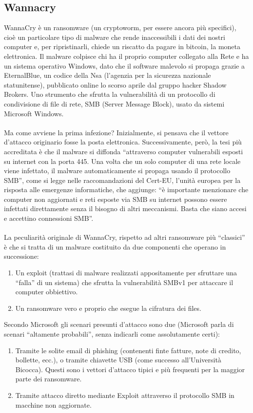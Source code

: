 \documentclass[8pt]{extarticle}
\begin{document}
\subsection{Wannacry}
WannaCry è un ransomware (un cryptoworm, per essere ancora più specifici), cioè un particolare tipo di malware che 
rende inaccessibili i dati dei nostri computer e, per ripristinarli, chiede un riscatto da pagare in bitcoin, 
la moneta elettronica. Il malware colpisce chi ha il proprio computer collegato alla Rete e ha un sistema operativo 
Windows, dato che il software malevolo si propaga grazie a EternalBlue, un codice della Nsa (l’agenzia per la 
sicurezza nazionale statunitense), pubblicato online lo scorso aprile dal gruppo hacker Shadow Brokers. 
Uno strumento che sfrutta la vulnerabilità di un protocollo di condivisione di file di rete, SMB (Server Message Block), 
usato da sistemi Microsoft Windows.\\\\
Ma come avviene la prima infezione? Inizialmente, si pensava che il vettore d’attacco originario fosse la posta 
elettronica. Successivamente, però, la tesi più accreditata è che il malware si diffonda “attraverso computer 
vulnerabili esposti su internet con la porta 445. Una volta che un solo computer di una rete locale viene infettato, 
il malware automaticamente si propaga usando il protocollo SMB”, come si legge nelle raccomandazioni del Cert-EU, 
l’unità europea per la risposta alle emergenze informatiche, che aggiunge: “è importante menzionare che computer 
non aggiornati e reti esposte via SMB su internet possono essere infettati direttamente senza il bisogno di altri 
meccanismi. Basta che siano accesi e accettino connessioni SMB”.\\\\
La peculiarità originale di WannaCry, rispetto ad altri ransomware più “classici” è che si tratta di un malware 
costituito da due componenti che operano in successione:
\begin{enumerate}
    \item Un exploit (trattasi di malware realizzati appositamente per sfruttare una “falla” di un sistema) 
    che sfrutta la vulnerabilità SMBv1 per attaccare il computer obbiettivo.
    \item Un ransomware vero e proprio che esegue la cifratura dei files.
\end{enumerate}
Secondo Microsoft gli scenari presunti d’attacco sono due (Microsoft parla di scenari “altamente probabili”, 
senza indicarli come assolutamente certi):
\begin{enumerate}
    \item Tramite le solite email di phishing (contenenti finte fatture, note di credito, bollette, ecc.), 
    o tramite chiavette USB (come successo all’Università Bicocca). Questi sono i vettori d’attacco tipici e 
    più frequenti per la maggior parte dei ransomware.
    \item Tramite attacco diretto mediante Exploit attraverso il protocollo SMB in macchine non aggiornate.
\end{enumerate}
\end{document}
